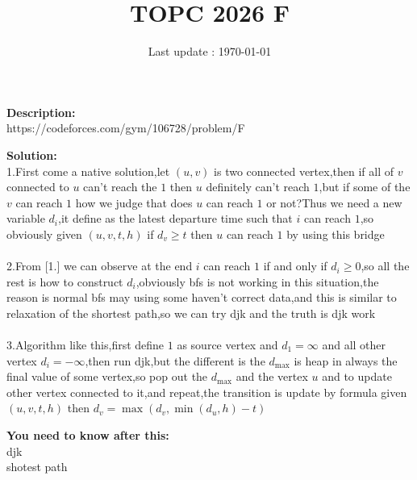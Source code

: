 \documentclass{article}
\begin{document}
\title{\textbf{TOPC 2026 F}}
\author{}
\date{Last update : \today}

\maketitle

\noindent \textbf{Description:}\\
https://codeforces.com/gym/106728/problem/F

\noindent \textbf{Solution:}\\
1.First come a native solution,let $(u,v)$ is two connected vertex,then if all of $v$ connected to $u$ can't reach the $1$ then $u$ definitely can't reach $1$,but if some of the $v$ can reach $1$ how we judge that does $u$ can reach $1$ or not?Thus we need a new variable $d_i$,it define as the latest departure time such that $i$ can reach $1$,so obviously given $(u,v,t,h)$ if $d_v\ge t$ then $u$ can reach $1$ by using this bridge\\
\\
2.From [1.] we can observe at the end $i$ can reach $1$ if and only if $d_i\ge 0$,so all the rest is how to construct $d_i$,obviously bfs is not working in this situation,the reason is normal bfs may using some haven't correct data,and this is similar to relaxation of the shortest path,so we can try djk and the truth is djk work\\
\\
3.Algorithm like this,first define $1$ as source vertex and $d_1=\infty$ and all other vertex $d_i=-\infty$,then run djk,but the different is the $d_{\max}$ is heap in always the final value of some vertex,so pop out the $d_{\max}$ and the vertex $u$ and to update other vertex connected to it,and repeat,the transition is update by formula given $(u,v,t,h)$ then $d_v=\max(d_v,\min(d_u,h)-t)$

\noindent \textbf{You need to know after this:}\\
djk\\
shotest path
\end{document}

